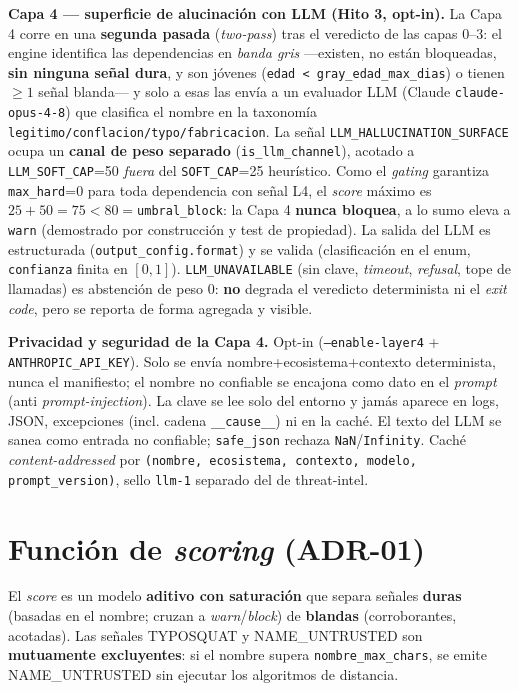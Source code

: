 \documentclass[11pt,a4paper]{article}
\begin{document}
\medskip
\noindent\textbf{Capa 4 --- superficie de alucinación con LLM (Hito 3, opt-in).}
La Capa 4 corre en una \textbf{segunda pasada} (\emph{two-pass}) tras el veredicto de las
capas 0--3: el engine identifica las dependencias en \emph{banda gris} ---existen, no están
bloqueadas, \textbf{sin ninguna señal dura}, y son jóvenes (\texttt{edad < gray\_edad\_max\_dias})
o tienen $\ge 1$ señal blanda--- y solo a esas las envía a un evaluador LLM (Claude
\texttt{claude-opus-4-8}) que clasifica el nombre en la taxonomía
\texttt{legitimo/conflacion/typo/fabricacion}. La señal \texttt{LLM\_HALLUCINATION\_SURFACE}
ocupa un \textbf{canal de peso separado} (\texttt{is\_llm\_channel}), acotado a
\texttt{LLM\_SOFT\_CAP}=50 \emph{fuera} del \texttt{SOFT\_CAP}=25 heurístico. Como el
\emph{gating} garantiza \texttt{max\_hard}=0 para toda dependencia con señal L4, el \emph{score}
máximo es $25+50=75 < 80=$\texttt{umbral\_block}: la Capa 4 \textbf{nunca bloquea}, a lo sumo
eleva a \texttt{warn} (demostrado por construcción y test de propiedad). La salida del LLM es
estructurada (\texttt{output\_config.format}) y se valida (clasificación en el enum,
\texttt{confianza} finita en $[0,1]$). \texttt{LLM\_UNAVAILABLE} (sin clave, \emph{timeout},
\emph{refusal}, tope de llamadas) es abstención de peso 0: \textbf{no} degrada el veredicto
determinista ni el \emph{exit code}, pero se reporta de forma agregada y visible.

\medskip
\noindent\textbf{Privacidad y seguridad de la Capa 4.} Opt-in (\texttt{--enable-layer4} +
\texttt{ANTHROPIC\_API\_KEY}). Solo se envía nombre+ecosistema+contexto determinista, nunca el
manifiesto; el nombre no confiable se encajona como dato en el \emph{prompt} (anti
\emph{prompt-injection}). La clave se lee solo del entorno y jamás aparece en logs, JSON,
excepciones (incl. cadena \texttt{\_\_cause\_\_}) ni en la caché. El texto del LLM se sanea como
entrada no confiable; \texttt{safe\_json} rechaza \texttt{NaN}/\texttt{Infinity}. Caché
\emph{content-addressed} por \texttt{(nombre, ecosistema, contexto, modelo, prompt\_version)},
sello \texttt{llm-1} separado del de threat-intel.

\section{Función de \emph{scoring} (ADR-01)}

El \emph{score} es un modelo \textbf{aditivo con saturación} que separa señales
\textbf{duras} (basadas en el nombre; cruzan a \emph{warn}/\emph{block}) de
\textbf{blandas} (corroborantes, acotadas). Las señales TYPOSQUAT y NAME\_UNTRUSTED son
\textbf{mutuamente excluyentes}: si el nombre supera \texttt{nombre_max_chars}, se
emite NAME\_UNTRUSTED sin ejecutar los algoritmos de distancia.
\end{document}
